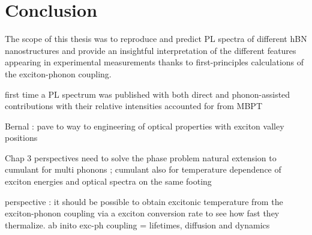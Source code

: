 \chapter*{Conclusion}

The scope of this thesis was to reproduce and predict PL spectra of different hBN nanostructures and provide an insightful interpretation of the different features appearing in experimental measurements thanks to first-principles calculations of the exciton-phonon coupling.



first time a PL spectrum was published with both direct and phonon-assisted contributions with their relative intensities accounted for from \acrshort{MBPT}

Bernal : pave to way to engineering of optical properties with exciton valley positions

Chap 3
perspectives
need to solve the phase problem 
natural extension to cumulant for multi phonons ; cumulant also for temperature dependence of exciton energies and optical spectra on the same footing

% 
perspective : it should be possible to obtain excitonic temperature from the exciton-phonon coupling via a exciton conversion rate to see how fast they thermalize.
ab inito exc-ph coupling = lifetimes, diffusion and dynamics